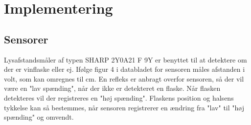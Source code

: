 \chapter*{Implementering}

\section*{Sensorer}
Lysafstandsmåler af typen SHARP 2Y0A21 F 9Y er benyttet til at detektere om der er vinflaske eller ej. Ifølge figur 4 i databladet for sensoren måles afstanden i volt, som kan omregnes til cm. En refleks er anbragt overfor sensoren, så der vil være en "lav spænding", når der ikke er detekteret en flaske. Når flasken detekteres vil der registreres en "høj spænding". Flaskens position og halsens tykkelse kan så bestemmes, når sensoren registrerer en ændring fra "lav" til "høj spænding" og omvendt. 